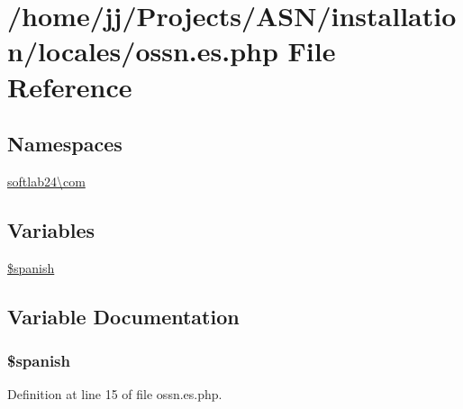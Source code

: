 \hypertarget{installation_2locales_2ossn_8es_8php}{}\section{/home/jj/\+Projects/\+A\+S\+N/installation/locales/ossn.es.\+php File Reference}
\label{installation_2locales_2ossn_8es_8php}
\subsection*{Namespaces}
\begin{DoxyCompactItemize}
\item 
 \hyperlink{namespacesoftlab24_1_1com}{softlab24\textbackslash{}com}
\end{DoxyCompactItemize}
\subsection*{Variables}
\begin{DoxyCompactItemize}
\item 
\hyperlink{installation_2locales_2ossn_8es_8php_a277e4b4201cc94bb7269c2d5995f0d7d}{\$spanish}
\end{DoxyCompactItemize}


\subsection{Variable Documentation}
\subsubsection[{\texorpdfstring{\$spanish}{$spanish}}]{\setlength{\rightskip}{0pt plus 5cm}\$spanish}\hypertarget{installation_2locales_2ossn_8es_8php_a277e4b4201cc94bb7269c2d5995f0d7d}{}\label{installation_2locales_2ossn_8es_8php_a277e4b4201cc94bb7269c2d5995f0d7d}


Definition at line 15 of file ossn.\+es.\+php.

